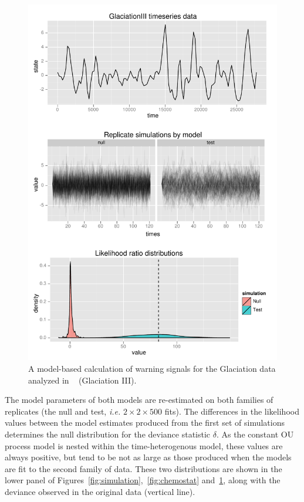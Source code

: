 \documentclass[authoryear,review,11pt]{elsarticle}
\begin{document}
 \begin{figure}
   \begin{center}
     \includegraphics[width=.85\linewidth]{figures/GlaciationIII_warningsignal.pdf}
     \caption{A model-based calculation of warning signals for the Glaciation data analyzed in ~\citet{Dakos2008} (Glaciation III).}
     \label{fig:glaciation}
  \end{center}
 \end{figure}


The model parameters of both models are re-estimated on both families of replicates 
(the null and test, \emph{i.e.} $2 \times 2 \times 500$ fits). 
The differences in the likelihood values between the model estimates produced from the first set of simulations 
determines the null distribution for the deviance statistic $\delta$.  
As the constant OU process model is nested within the time-heterogenous model, these values are always positive,
but tend to be not as large as those produced when the models are fit to the second family of data. 
These two distributions are shown in the lower panel of 
Figures~\ref{fig:simulation},~\ref{fig:chemostat} and~\ref{fig:glaciation}, 
along with the deviance observed in the original data (vertical line).
\end{document}
